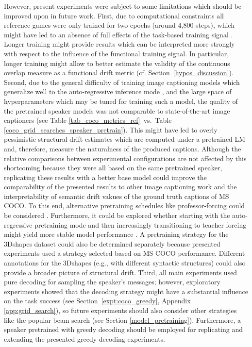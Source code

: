 However, present experiments were subject to some limitations which should be improved upon in future work. First, due to computational constraints all reference games were only trained for two epochs (around 4,800 steps), which might have led to an absence of full effects of the task-based training signal \parencite[compared to, e.g.,][who had 300,000 training steps]{lee2019countering}. Longer training might provide results which can be interpreted more strongly with respect to the influence of the functional training signal. In particular, longer training might allow to better estimate the validity of the continuous overlap measure as a functional drift metric (cf. Section~\ref{hypos_discussion}).
Second, due to the general difficulty of training image captioning models which generalize well to the auto-regressive inference mode \parencite{lamb2016professor}, and the large space of hyperparameters which may be tuned for training such a model, the quality of the pretrained speaker models was not comparable to state-of-the-art image captioners (see Table \ref{tab_coco_metrics_ref}~vs.~Table \ref{coco_grid_searches_speaker_pretrain}). This might have led to overly pessimistic structural drift estimates which are computed under a pretrained LM and, therefore, measure the naturalness of the produced captions. Although the relative comparisons between experimental configurations are not affected by this shortcoming because they were all based on the same pretrained speaker, replicating these results with a better base model could improve the comparability of the presented results to other image captioning work and the interpretability of semantic drift vakues of the ground truth captions of MS COCO. To this end, alternative pretraining schedules like professor-forcing could be considered \parencite{lamb2016professor}. Furthermore, it could be explored whether starting with the auto-regressive pretraining mode and then increasingly transitioning to teacher forcing might yield more stable model performance \parencite[although similar explorations by][suggest that this order might not work very well]{lowe2020interaction}. A pretraining strategy for the 3Dshapes dataset could also be determined separately because presented experiments used a strategy selected based on MS COCO performance. Different annotations for the 3Dshapes (e.g., with different syntactic structures) could also provide a broader picture of structural drift.
Third, all main experiments used pure decoding for sampling the speaker's messages; however, exploratory experiments showed that the decoding strategy might have a substantial influence on the task success (see Section~\ref{expt:coco_greedy}, Appendix \ref{app:grid_search}), so future experiments should also consider other strategies like the popular beam search (see Section \ref{model_pretraining}). Furthermore, a speaker pretrained with greedy decoding should be employed for replicating and extending the presented greedy decoding experiments.
